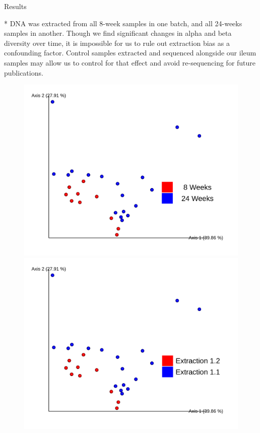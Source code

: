\documentclass[final]{beamer}
\newlength{\colwidth}
\begin{document}
\begin{frame}[t]
\begin{columns}[t]
\begin{column}{\colwidth}
\begin{block}{Results}
    \begin{tcolorbox}
    [width=\textwidth, colframe=blue]
      * DNA was extracted from all 8-week samples in one batch, and all
      24-weeks samples in another. Though we find significant changes in
      alpha and beta diversity over time, it is impossible for us to rule out
      extraction bias as a confounding factor. Control samples extracted
      and sequenced alongside our ileum samples may allow us to control for 
      that effect and avoid re-sequencing for future publications. 
    \end{tcolorbox}

    \begin{figure}[!htb]
        \begin{center}
          \includegraphics[width=\linewidth]{assets/w_unifrac_age_wk}
        \end{center}
      \endminipage
        \begin{center}
          \includegraphics[width=\linewidth]{assets/w_unifrac_extraction}

\end{center}
\end{figure}
\end{block}
\end{column}
\end{columns}
\end{frame}
\end{document}
